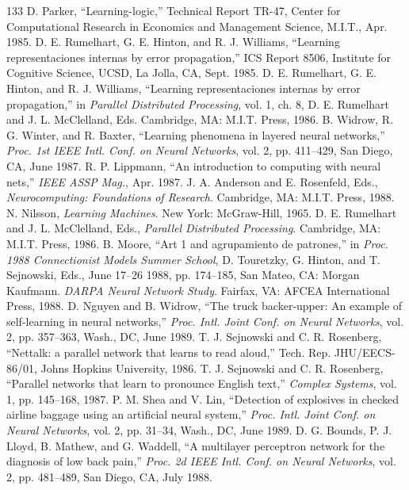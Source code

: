 \documentclass[10pt,twocolumn]{article}
\begin{document}
\begin{thebibliography}{133}
 D. Parker, ``Learning-logic,'' Technical Report TR-47, Center for Computational Research in Economics and Management Science, M.I.T., Apr. 1985.
 D. E. Rumelhart, G. E. Hinton, and R. J. Williams, ``Learning representaciones internas by error propagation,'' ICS Report 8506, Institute for Cognitive Science, UCSD, La Jolla, CA, Sept. 1985.
 D. E. Rumelhart, G. E. Hinton, and R. J. Williams, ``Learning representaciones internas by error propagation,'' in \textit{Parallel Distributed Processing}, vol. 1, ch. 8, D. E. Rumelhart and J. L. McClelland, Eds. Cambridge, MA: M.I.T. Press, 1986.
 B. Widrow, R. G. Winter, and R. Baxter, ``Learning phenomena in layered neural networks,'' \textit{Proc. 1st IEEE Intl. Conf. on Neural Networks}, vol. 2, pp. 411--429, San Diego, CA, June 1987.
 R. P. Lippmann, ``An introduction to computing with neural nets,'' \textit{IEEE ASSP Mag.}, Apr. 1987.
 J. A. Anderson and E. Rosenfeld, Eds., \textit{Neurocomputing: Foundations of Research}. Cambridge, MA: M.I.T. Press, 1988.
 N. Nilsson, \textit{Learning Machines}. New York: McGraw-Hill, 1965.
 D. E. Rumelhart and J. L. McClelland, Eds., \textit{Parallel Distributed Processing}. Cambridge, MA: M.I.T. Press, 1986.
 B. Moore, ``Art 1 and agrupamiento de patrones,'' in \textit{Proc. 1988 Connectionist Models Summer School}, D. Touretzky, G. Hinton, and T. Sejnowski, Eds., June 17--26 1988, pp. 174--185, San Mateo, CA: Morgan Kaufmann.
 \textit{DARPA Neural Network Study}. Fairfax, VA: AFCEA International Press, 1988.
 D. Nguyen and B. Widrow, ``The truck backer-upper: An example of self-learning in neural networks,'' \textit{Proc. Intl. Joint Conf. on Neural Networks}, vol. 2, pp. 357--363, Wash., DC, June 1989.
 T. J. Sejnowski and C. R. Rosenberg, ``Nettalk: a parallel network that learns to read aloud,'' Tech. Rep. JHU/EECS-86/01, Johns Hopkins University, 1986.
 T. J. Sejnowski and C. R. Rosenberg, ``Parallel networks that learn to pronounce English text,'' \textit{Complex Systems}, vol. 1, pp. 145--168, 1987.
 P. M. Shea and V. Lin, ``Detection of explosives in checked airline baggage using an artificial neural system,'' \textit{Proc. Intl. Joint Conf. on Neural Networks}, vol. 2, pp. 31--34, Wash., DC, June 1989.
 D. G. Bounds, P. J. Lloyd, B. Mathew, and G. Waddell, ``A multilayer perceptron network for the diagnosis of low back pain,'' \textit{Proc. 2d IEEE Intl. Conf. on Neural Networks}, vol. 2, pp. 481--489, San Diego, CA, July 1988.

\end{thebibliography}
\end{document}
